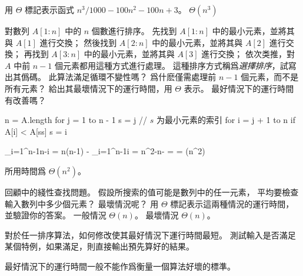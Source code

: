 \startsection[
  title={Analyzing algorithms},
]

\startEXERCISE
用 $\Theta$ 標記表示函式 $n^3 / 1000 - 100 n^2 - 100 n + 3$。
\stopEXERCISE
\startANSWER
$\Theta(n^3)$
\stopANSWER

對數列 $A[1:n]$ 中的 $n$ 個數進行排序。
先找到 $A[1:n]$ 中的最小元素，並將其與 $A[1]$ 進行交換；
然後找到 $A[2:n]$ 中的最小元素，並將其與 $A[2]$ 進行交換；
再找到 $A[3:n]$ 中的最小元素，並將其與 $A[3]$ 進行交換；
依次类推，對 $A$ 中前 $n-1$ 個元素都用這種方式進行處理。
這種排序方式稱爲\emph{選擇排序}，試寫出其僞碼。
此算法滿足循環不變性嗎？
爲什麽僅需處理前 $n-1$ 個元素，而不是所有元素？
給出其最壞情況下的運行時間，用 $\Theta$ 表示。
最好情況下的運行時間有改善嗎？
\stopEXERCISE

\startANSWER
\startCLRSCODE
n = A.length
for j = 1 to n - 1
	s = j	// $s$ 为最小元素的索引
	for i = j + 1 to n
		if A[i] < A[ss]
			s = i
\stopCLRSCODE

\startsplitformula
\startmathalignment[n=2]
\NC \NC\sum_{i=1}^{n-1}n-i \NR
\NC = \NC n(n-1) - \sum_{i=1}^{n-1}i \NR
\NC = \NC n^2-n- \NR
\NC = \NC {} \NR
\NC = \NC \Theta(n^2) \NR
\stopmathalignment
\stopsplitformula

所用時間爲 $\Theta(n^2)$。
\stopANSWER

\startEXERCISE
回顧中的綫性查找問題。
假設所搜索的值可能是數列中的任一元素，
平均要檢查輸入數列中多少個元素？
最壞情況呢？
用 $\Theta$ 標記表示這兩種情況的運行時間，
並驗證你的答案。
\stopEXERCISE
\startANSWER
一般情況 $\Theta(n)$。
最壞情況 $\Theta(n)$。
\stopANSWER

\startEXERCISE
對於任一排序算法，如何修改使其最好情況下運行時間最短。
\stopEXERCISE
\startANSWER
測試輸入是否滿足某個特例，如果滿足，則直接輸出預先算好的結果。

最好情況下的運行時間一般不能作爲衡量一個算法好壞的標準。
\stopANSWER

\stopsection
